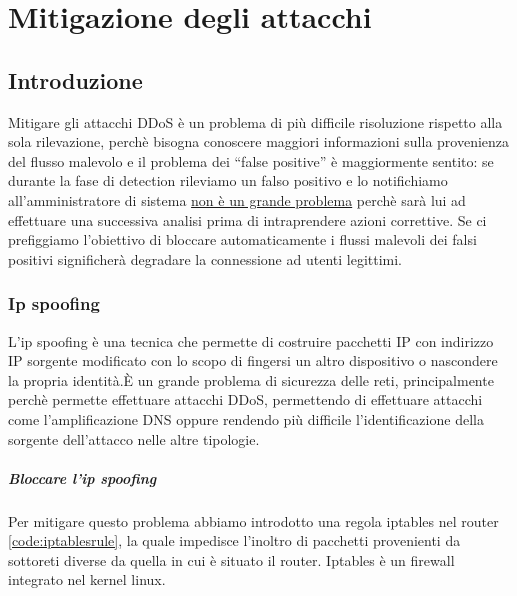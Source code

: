 \chapter{Mitigazione degli attacchi}


\section{Introduzione}

Mitigare gli attacchi DDoS è un problema di più difficile risoluzione rispetto alla sola rilevazione, perchè bisogna conoscere maggiori informazioni sulla provenienza del flusso malevolo e il problema dei ``false positive'' è maggiormente sentito: se durante la fase di detection rileviamo un falso positivo e lo notifichiamo all'amministratore di sistema \underline{non è un grande problema} perchè sarà lui ad effettuare una successiva analisi prima di intraprendere azioni correttive. Se ci prefiggiamo l'obiettivo di bloccare automaticamente i flussi malevoli dei falsi positivi significherà degradare la connessione ad utenti legittimi.

\subsection{Ip spoofing}

L'ip spoofing è una tecnica che permette di costruire pacchetti IP con indirizzo IP sorgente modificato con lo scopo di fingersi un altro dispositivo o nascondere la propria identità.È un grande problema di sicurezza delle reti, principalmente perchè permette effettuare attacchi DDoS, permettendo di effettuare attacchi come l'amplificazione DNS oppure rendendo più difficile l'identificazione della sorgente dell'attacco nelle altre tipologie.



\paragraph{Bloccare l'ip spoofing}
Per mitigare questo problema abbiamo introdotto una regola iptables nel router \ref{code:iptablesrule}, la quale impedisce l'inoltro di pacchetti provenienti da sottoreti diverse da quella in cui è situato il router.
Iptables è un firewall integrato nel kernel linux.

